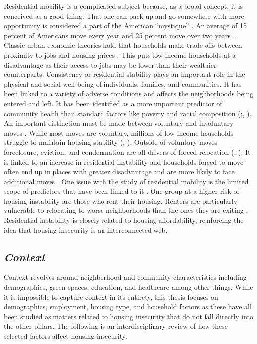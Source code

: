 Residential mobility is a complicated subject because, as a broad concept, it is conceived as a good thing. That one can pack up and go somewhere with more opportunity is considered a part of the American “mystique” \citep{molloy_internal_2011}. An average of 15 percent of Americans move every year and 25 percent move over two years \citep{bachmann_ins_2014}. Classic urban economic theories hold that households make trade-offs between proximity to jobs and housing prices \citep{hu_housing_2019}. This puts low-income households at a disadvantage as their access to jobs may be lower than their wealthier counterparts. Consistency or residential stability plays an important role in the physical and social well-being of individuals, families, and communities. It has been linked to a variety of adverse conditions and affects the neighborhoods being entered and left. It has been identified as a more important predictor of community health than standard factors like poverty and racial composition (\citealp{desmond_forced_2015};\citealp{desmond_housing_2016}, \citealp{rauh_housing_2008}). An important distinction must be made between voluntary and involuntary moves \citep{siskar_who_2019}. While most moves are voluntary, millions of low-income households struggle to maintain housing stability (\citealp{phinney_exploring_2013}; \citealp{kang_why_2019}). Outside of voluntary moves foreclosure, eviction, and condemnation are all drivers of forced relocation (\citealp{phinney_exploring_2013}; \citealp{siskar_who_2019}). It is linked to an increase in residential instability and households forced to move often end up in places with greater disadvantage and are more likely to face additional moves \citep{desmond_forced_sholl_2015}. One issue with the study of residential mobility is the limited scope of predictors that have been linked to it \citep{kang_why_2019}. One group at a higher risk of housing instability are those who rent their housing. Renters are particularly vulnerable to relocating to worse neighborhoods than the ones they are exiting \citep{desmond_forced_2015}. Residential instability is closely related to housing affordability, reinforcing the idea that housing insecurity is an interconnected web.

\subsection{\textit{Context}}

Context revolves around neighborhood and community characteristics including demographics, green spaces, education, and healthcare among other things. While it is impossible to capture context in its entirety, this thesis focuses on demographics, employment, housing type, and household factors as these have all been studied as matters related to housing insecurity that do not fall directly into the other pillars. The following is an interdisciplinary review of how these selected factors affect housing insecurity.  

